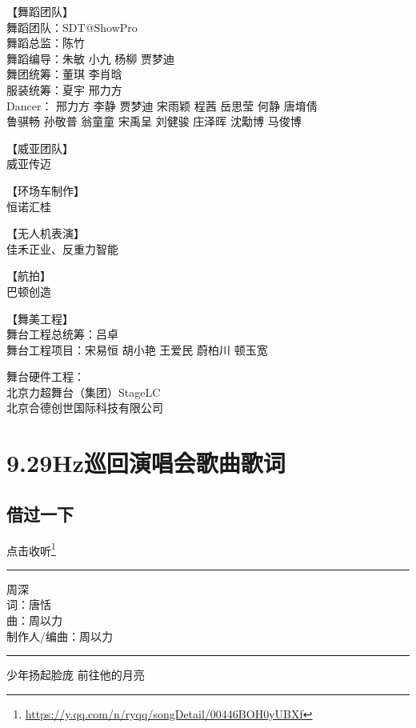 \documentclass[]{ctexbook}
\renewcommand{\href}[2]{#2\footnote{\url{#1}}}
\begin{document}
【舞蹈团队】\\
舞蹈团队：SDT@ShowPro\\
舞蹈总监：陈竹\\
舞蹈编导：朱敏 小九 杨柳 贾梦迪\\
舞团统筹：董琪 李肖晗\\
服装统筹：夏宇 邢力方\\
Dancer： 邢力方 李静 贾梦迪 宋雨颖 程茜 岳思莹 何静 唐堉倩\\
鲁骐畅 孙敬普 翁童童 宋禹呈 刘健骏 庄泽晖 沈勱博 马俊博

【威亚团队】\\
威亚传迈

【环场车制作】\\
恒诺汇桂

【无人机表演】\\
佳禾正业、反重力智能

【航拍】\\
巴顿创造

【舞美工程】\\
舞台工程总统筹：吕卓\\
舞台工程项目：宋易恒 胡小艳 王爱民 蔚柏川 顿玉宽

舞台硬件工程：\\
北京力超舞台（集团）StageLC\\
北京合德创世国际科技有限公司

\chapter{9.29Hz巡回演唱会歌曲歌词}\label{appendix-song-lyric}

\section*{借过一下}\label{I-will-go-my-way}


\href{https://y.qq.com/n/ryqq/songDetail/00446BOH0yUBXf}{点击收听}

\begin{center}\rule{0.5\linewidth}{0.5pt}\end{center}

周深\\
词：唐恬\\
曲：周以力\\
制作人/编曲：周以力

\begin{center}\rule{0.5\linewidth}{0.5pt}\end{center}

少年扬起脸庞 前往他的月亮
\end{document}
